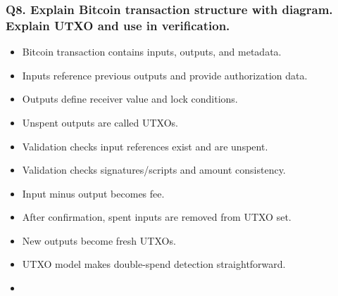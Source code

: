 \documentclass[12pt,a4paper]{article}
\begin{document}
\subsubsection*{Q8. Explain Bitcoin transaction structure with diagram. Explain UTXO and use in verification.}
\begin{itemize}
\item Bitcoin transaction contains inputs, outputs, and metadata.
\item Inputs reference previous outputs and provide authorization data.
\item Outputs define receiver value and lock conditions.
\item Unspent outputs are called UTXOs.
\item Validation checks input references exist and are unspent.
\item Validation checks signatures/scripts and amount consistency.
\item Input minus output becomes fee.
\item After confirmation, spent inputs are removed from UTXO set.
\item New outputs become fresh UTXOs.
\item UTXO model makes double-spend detection straightforward.
\item[]
\vspace{0.25em}
\noindent{}
\end{itemize}
\end{document}
